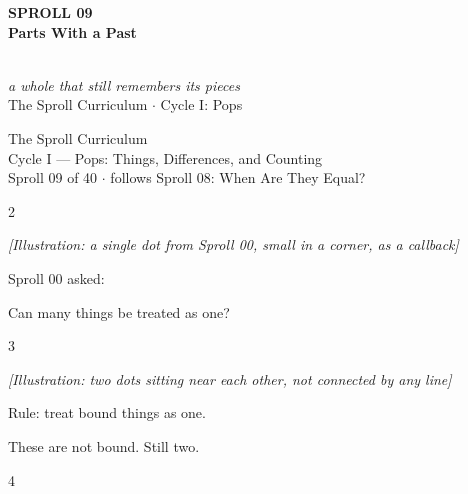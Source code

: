 \documentclass[12pt]{book}
\newcommand{\artnote}[1]{{\color{gray!70}\small\itshape [Illustration: #1]}\par\vspace{0.3in}}
\newcommand{\bigline}[1]{{\Huge #1}\par}
\newcommand{\pagenum}[1]{\vfill{\color{gray!50}\footnotesize #1}}
\newcommand{\sprollpage}{\newpage\vspace*{0.4in}}
\begin{document}
\thispagestyle{empty}
\begin{center}
\vspace*{1.1in}
{\Huge \textbf{SPROLL 09}}\\[0.4in]
{\huge \textbf{Parts With a Past}}\\[0.5in]
\\[0.4in]
{\large \textit{a whole that still remembers its pieces}}\\[0.3in]
{\small The Sproll Curriculum $\cdot$ Cycle I: Pops}
\end{center}

\sprollpage
\begin{center}
\vspace*{1.5in}
{\Large The Sproll Curriculum}\\[0.2in]
{\normalsize Cycle I --- Pops: Things, Differences, and Counting}\\[0.6in]
{\small Sproll 09 of 40 \quad $\cdot$ \quad follows Sproll 08: When Are They Equal?}
\end{center}
\pagenum{2}

\sprollpage
\begin{center}
\vspace*{0.7in}
\artnote{a single dot from Sproll 00, small in a corner, as a callback}
\vspace{0.35in}
\bigline{Sproll 00 asked:}\vspace{0.1in}
{\Large Can many things be treated as one?}
\end{center}
\pagenum{3}

\sprollpage
\begin{center}
\vspace*{0.6in}
\artnote{two dots sitting near each other, not connected by any line}
\vspace{0.3in}
\bigline{Rule: treat bound things as one.}\vspace{0.1in}
{\Large These are not bound. Still two.}
\end{center}
\pagenum{4}
\end{document}
